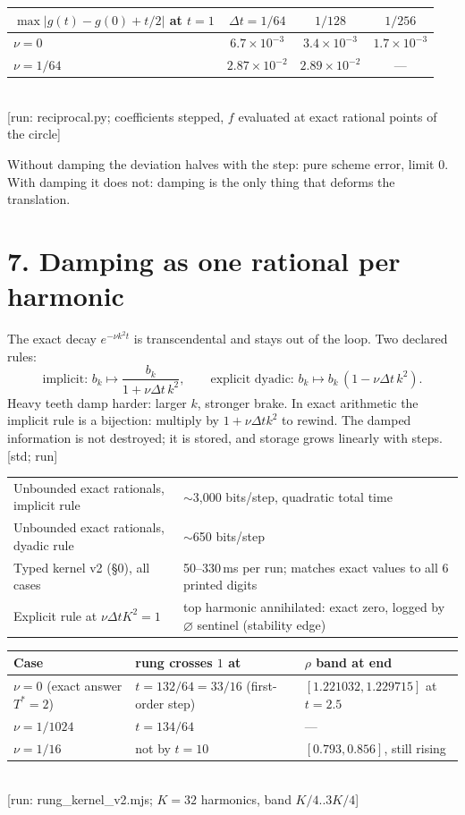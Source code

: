 \documentclass[11pt,a4paper]{article}
\newcommand{\stamp}[1]{\textsf{\small[#1]}}
\newcommand{\E}{\varnothing}
\begin{document}
\begin{center}\small
\begin{tabular}{@{}lccc@{}}\toprule
$\max|g(t)-g(0)+t/2|$ at $t=1$ & $\Delta t=1/64$ & $1/128$ & $1/256$\\\midrule
$\nu=0$ & $6.7\times10^{-3}$ & $3.4\times10^{-3}$ & $1.7\times10^{-3}$\\
$\nu=1/64$ & $2.87\times10^{-2}$ & $2.89\times10^{-2}$ & ---\\\bottomrule
\end{tabular}\\[2pt]
\stamp{run: reciprocal.py; coefficients stepped, $f$ evaluated at exact rational points of the circle}
\end{center}
Without damping the deviation halves with the step: pure scheme error, limit $0$. With damping it does not: damping is the only thing that deforms the translation.

\section*{7. Damping as one rational per harmonic}
The exact decay $e^{-\nu k^2 t}$ is transcendental and stays out of the loop. Two declared rules:
\[
\text{implicit: } b_k\mapsto\frac{b_k}{1+\nu\Delta t\,k^2},\qquad \text{explicit dyadic: } b_k\mapsto b_k\,(1-\nu\Delta t\,k^2).
\]
Heavy teeth damp harder: larger $k$, stronger brake. In exact arithmetic the implicit rule is a bijection: multiply by $1+\nu\Delta t k^2$ to rewind. The damped information is not destroyed; it is stored, and storage grows linearly with steps. \stamp{std; run}

\begin{center}\small
\begin{tabular}{@{}ll@{}}\toprule
Unbounded exact rationals, implicit rule & $\sim$3{,}000 bits/step, quadratic total time\\
Unbounded exact rationals, dyadic rule & $\sim$650 bits/step\\
Typed kernel v2 (\S0), all cases & 50--330\,ms per run; matches exact values to all 6 printed digits\\
Explicit rule at $\nu\Delta t K^2=1$ & top harmonic annihilated: exact zero, logged by $\E$ sentinel (stability edge)\\\bottomrule
\end{tabular}
\end{center}

\begin{center}\small
\begin{tabular}{@{}lll@{}}\toprule
Case & rung crosses $1$ at & $\rho$ band at end\\\midrule
$\nu=0$ (exact answer $T^*=2$) & $t=132/64=33/16$ (first-order step) & $[1.221032,1.229715]$ at $t=2.5$\\
$\nu=1/1024$ & $t=134/64$ & ---\\
$\nu=1/16$ & not by $t=10$ & $[0.793,0.856]$, still rising\\\bottomrule
\end{tabular}\\[2pt]
\stamp{run: rung\_kernel\_v2.mjs; $K=32$ harmonics, band $K/4..3K/4$}
\end{center}
\end{document}
